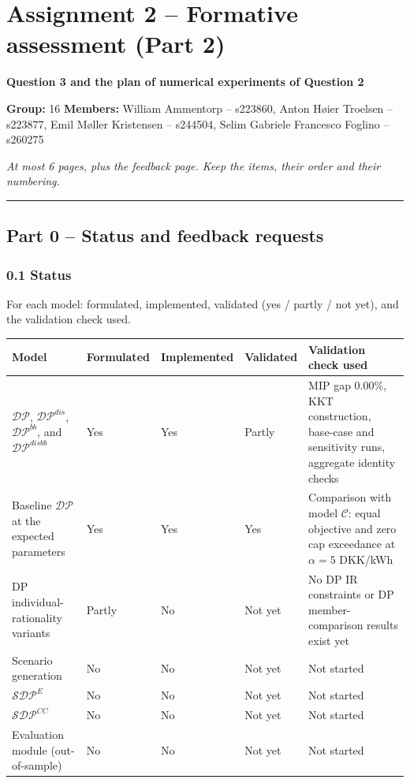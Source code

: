\documentclass[]{article}
\author{}
\date{}
\begin{document}
\section{Assignment 2 -- Formative assessment (Part 2)}
\label{assignment-2-formative-assessment-part-2}

\textbf{Question 3 and the plan of numerical experiments of Question 2}

\textbf{Group:} 16
\textbf{Members:} William Ammentorp -- s223860, Anton H{\o}ier Troelsen -- s223877,
Emil M{\o}ller Kristensen -- s244504, Selim Gabriele Francesco Foglino -- s260275

\emph{At most 6 pages, plus the feedback page. Keep the items, their order and their numbering.}

\begin{center}\rule{0.5\linewidth}{0.5pt}\end{center}

\subsection{Part 0 -- Status and feedback requests}
\label{part-0-status-and-feedback-requests}

\subsubsection{0.1 Status}
\label{status}

For each model: formulated, implemented, validated (yes / partly / not yet), and the validation check used.

\begin{longtable}[]{@{}lllll@{}}
\toprule
Model & Formulated & Implemented & Validated & Validation check used \\
\midrule
\endhead
\(\mathcal{DP}\), \(\mathcal{DP}^{dis}\), \(\mathcal{DP}^{bb}\), and
\(\mathcal{DP}^{disbb}\) & Yes & Yes & Partly & MIP gap 0.00\%, KKT construction,
base-case and sensitivity runs, aggregate identity checks \\
Baseline \(\mathcal{DP}\) at the expected parameters & Yes & Yes & Yes &
Comparison with model \(\mathcal{C}\): equal objective and zero cap exceedance
at \(\alpha=5\) DKK/kWh \\
DP individual-rationality variants & Partly & No & Not yet &
No DP IR constraints or DP member-comparison results exist yet \\
Scenario generation & No & No & Not yet &
Not started \\
\(\mathcal{SDP}^{E}\) & No & No & Not yet &
Not started \\
\(\mathcal{SDP}^{CC}\) & No & No & Not yet &
Not started \\
Evaluation module (out-of-sample) & No & No & Not yet &
Not started \\
\bottomrule
\end{longtable}
\end{document}
